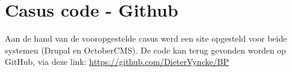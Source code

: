 \chapter{Casus code - Github}
\label{AppendixCode}

Aan de hand van de vooropgestelde casus werd een site opgesteld voor beide systemen (Drupal en OctoberCMS).
\newline\newline
De code kan terug gevonden worden op GitHub, \newline 
via deze link: \hyperlink{https://github.com/DieterVyncke/BP}{https://github.com/DieterVyncke/BP}
